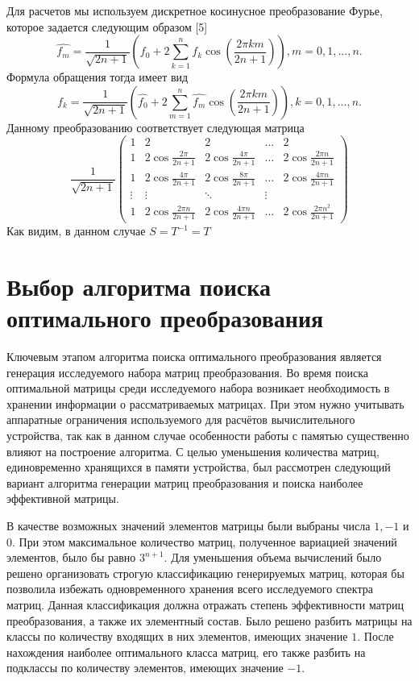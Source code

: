 \documentclass[11pt, oneside, a4paper]{article}
\begin{document}
Для расчетов мы используем дискретное косинусное преобразование Фурье, которое задается следующим образом [5]
\begin{equation}
\label{DCT}
\hat{f_m}=\frac{1}{\sqrt{2n+1}}(f_0+2\sum\limits_{k=1}^{n}f_k\cos(\frac{2 \pi k m}{2n+1})), m=0,1,...,n.
\end{equation}
Формула обращения тогда имеет вид
\begin{equation}
\label{inverseDCT}
f_k=\frac{1}{\sqrt{2n+1}}(\hat{f_0}+2\sum\limits_{m=1}^{n}\hat{f_m}\cos(\frac{2 \pi k m}{2n+1})), k=0,1,...,n.
\end{equation}
Данному преобразованию соответствует следующая матрица
\begin{equation}
\label{matrixDCT}
\frac{1}{\sqrt{2n+1}}\begin{pmatrix}
1 & 2 & 2 & \ldots & 2\\
1 & 2\cos\frac{2 \pi}{2n+1} & 2\cos\frac{4 \pi}{2n+1} & \ldots & 2\cos\frac{2 \pi n}{2n+1}\\
1 & 2\cos\frac{4 \pi}{2n+1} & 2\cos\frac{8 \pi}{2n+1} & \ldots & 2\cos\frac{4 \pi n}{2n+1}\\
\vdots & \vdots & \ddots & \vdots\\
1 & 2\cos\frac{2 \pi n}{2n+1} & 2\cos\frac{4 \pi n}{2n+1} & \ldots & 2\cos\frac{2 \pi n^2}{2n+1}
\end{pmatrix}
\end{equation}
Как видим, в данном случае $S=T^{-1}=T$

\section{Выбор алгоритма поиска оптимального преобразования}

Ключевым этапом алгоритма поиска оптимального преобразования является генерация исследуемого набора матриц преобразования. Во время поиска оптимальной матрицы среди исследуемого набора возникает необходимость в хранении информации о рассматриваемых матрицах. При этом нужно                   учитывать аппаратные ограничения используемого для расчётов вычислительного устройства, так как в данном случае особенности работы с памятью существенно влияют на построение алгоритма. С целью уменьшения количества матриц, единовременно хранящихся в памяти устройства, был рассмотрен следующий вариант алгоритма генерации матриц преобразования и поиска наиболее эффективной матрицы.

В качестве возможных значений элементов матрицы были выбраны числа $1, -1$ и $0$. При этом максимальное количество матриц, полученное вариацией значений элементов, было бы равно $3^{n+1}$. Для уменьшения объема вычислений было решено организовать строгую классификацию генерируемых матриц, которая бы позволила избежать одновременного хранения всего исследуемого спектра матриц. Данная классификация должна отражать степень эффективности матриц преобразования, а также их элементный состав. Было решено разбить матрицы на классы по количеству входящих в них элементов, имеющих значение $1$. После нахождения наиболее оптимального класса матриц, его также разбить на подклассы по количеству элементов, имеющих значение $-1$.
\end{document}
